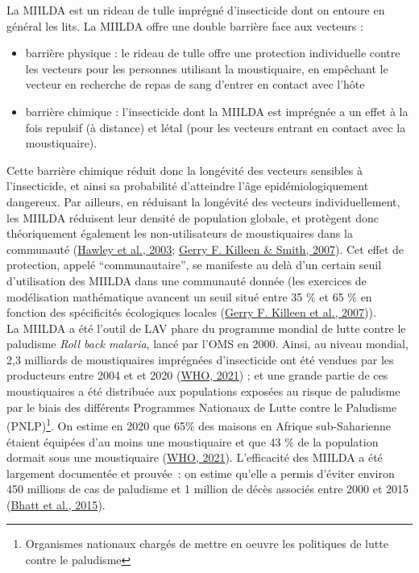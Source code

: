 \documentclass[12pt,twoside]{reedthesis}
\providecommand{\tightlist}{%
  \setlength{\itemsep}{0pt}\setlength{\parskip}{0pt}}
\begin{document}
La MIILDA est un rideau de tulle imprégné d'insecticide dont on entoure en général les lits. La MIILDA offre une double barrière face aux vecteurs :
\begin{itemize}
\tightlist
\item
  barrière physique : le rideau de tulle offre une protection individuelle contre les vecteurs pour les personnes utilisant la moustiquaire, en empêchant le vecteur en recherche de repas de sang d'entrer en contact avec l'hôte
\item
  barrière chimique : l'insecticide dont la MIILDA est imprégnée a un effet à la fois repulsif (à distance) et létal (pour les vecteurs entrant en contact avec la moustiquaire).
\end{itemize}
Cette barrière chimique réduit donc la longévité des vecteurs sensibles à l'insecticide, et ainsi sa probabilité d'atteindre l'âge epidémiologiquement dangereux. Par ailleurs, en réduisant la longévité des vecteurs individuellement, les MIILDA réduisent leur densité de population globale, et protègent donc théoriquement également les non-utilisateurs de moustiquaires dans la communauté (\protect\hyperlink{ref-hawley_community-wide_2003}{Hawley et al., 2003}; \protect\hyperlink{ref-killeen_exploring_2007}{Gerry F. Killeen \& Smith, 2007}). Cet effet de protection, appelé ``communautaire'', se manifeste au delà d'un certain seuil d'utilisation des MIILDA dans une communauté donnée (les exercices de modélisation mathématique avancent un seuil situé entre 35 \% et 65 \% en fonction des spécificités écologiques locales (\protect\hyperlink{ref-killeen_preventing_2007}{Gerry F. Killeen et al., 2007})).\\

La MIILDA a été l'outil de LAV phare du programme mondial de lutte contre le paludisme \emph{Roll back malaria}, lancé par l'OMS en 2000. Ainsi, au niveau mondial, 2,3 milliards de moustiquaires imprégnées d'insecticide ont été vendues par les producteurs entre 2004 et et 2020 (\protect\hyperlink{ref-who_2021}{WHO, 2021}) ; et une grande partie de ces moustiquaires a été distribuée aux populations exposées au risque de paludisme par le biais des différents Programmes Nationaux de Lutte contre le Paludisme (PNLP)\footnote{Organismes nationaux chargés de mettre en oeuvre les politiques de lutte contre le paludisme}. On estime en 2020 que 65\% des maisons en Afrique sub-Saharienne étaient équipées d'au moins une moustiquaire et que 43 \% de la population dormait sous une moustiquaire (\protect\hyperlink{ref-who_2021}{WHO, 2021}). L'efficacité des MIILDA a été largement documentée et prouvée~: on estime qu'elle a permis d'éviter environ 450 millions de cas de paludisme et 1 million de décès associés entre 2000 et 2015 (\protect\hyperlink{ref-bhatt_effect_2015}{Bhatt et al., 2015}).\\
\end{document}

